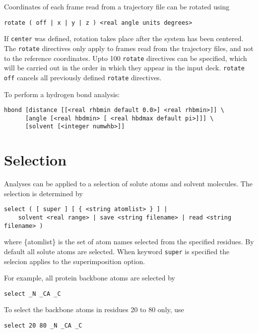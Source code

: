 Coordinates of each frame read from a trajectory file can be 
rotated using

\begin{verbatim}
rotate ( off | x | y | z ) <real angle units degrees>
\end{verbatim}

If \verb+center+ was defined, rotation takes place after
the system has been centered. The \verb+rotate+ directives
only apply to frames read from the trajectory files, and not
to the reference coordinates. Upto 100 \verb+rotate+ directives
can be specified, which will be carried out in the order in which
they appear in the input deck. \verb+rotate off+ cancels all
previously defined \verb+rotate+ directives.

To perform a hydrogen bond analysis:

\begin{verbatim}
hbond [distance [[<real rhbmin default 0.0>] <real rhbmin>]] \
      [angle [<real hbdmin> [ <real hbdmax default pi>]]] \
      [solvent [<integer numwhb>]]
\end{verbatim}

\section{Selection}

Analyses can be applied to a selection of solute atoms and solvent molecules. 
The selection is determined by

\begin{verbatim}
select ( [ super ] [ { <string atomlist> } ] |
	solvent <real range> | save <string filename> | read <string filename> )
\end{verbatim}

where {\rm \{atomlist\}} is the set of atom names selected from the specified residues. 
By default all solute atoms are selected. When keyword \verb+super+ is specified the selecion
applies to the superimposition option.

\par
For example, all protein backbone atoms are selected by

\begin{verbatim}
select _N _CA _C
\end{verbatim}

To select the backbone atoms in residues 20 to 80 only, use

\begin{verbatim}
select 20 80 _N _CA _C
\end{verbatim}

